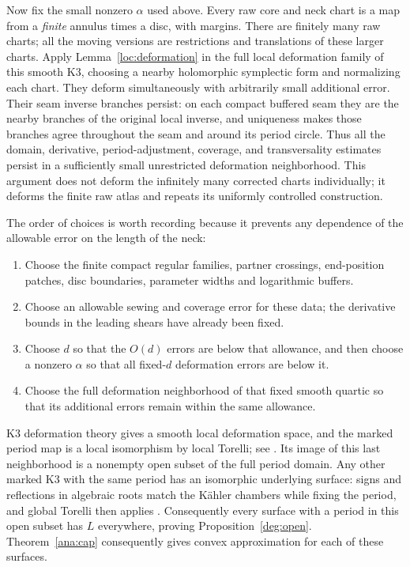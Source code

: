 Now fix the small nonzero $\alpha$ used above.  Every raw core
and neck chart is a map from a \emph{finite} annulus times a
disc, with margins.  There are finitely many raw charts;
all the moving versions are restrictions and translations of
these larger charts.  Apply Lemma~\ref{loc:deformation} in the
full local deformation family of this smooth K3, choosing a
nearby holomorphic symplectic form and normalizing each chart.
They deform simultaneously with arbitrarily small additional
error.  Their seam inverse branches persist: on each compact
buffered seam they are the nearby branches of the original
local inverse, and uniqueness makes those branches agree
throughout the seam and around its period circle.  Thus all
the domain, derivative, period-adjustment, coverage, and
transversality estimates persist in a sufficiently small
unrestricted deformation neighborhood.  This argument does
not deform the infinitely many corrected charts individually;
it deforms the finite raw atlas and repeats its uniformly
controlled construction.

The order of choices is worth recording because it prevents
any dependence of the allowable error on the length of the
neck:
\begin{enumerate}
 \item Choose the finite compact regular families, partner
       crossings, end-position patches, disc boundaries,
       parameter widths and logarithmic buffers.
 \item Choose an allowable sewing and coverage error for
       these data; the derivative bounds in the leading
       shears have already been fixed.
 \item Choose $d$ so that the $O(d)$ errors are below that
       allowance, and then choose a nonzero $\alpha$ so that
       all fixed-$d$ deformation errors are below it.
 \item Choose the full deformation neighborhood of that
       fixed smooth quartic so that its additional errors
       remain within the same allowance.
\end{enumerate}

K3 deformation theory gives a smooth local deformation space,
and the marked period map is a local isomorphism by local
Torelli; see \cite{Huybrechts}.  Its image of this last
neighborhood is a nonempty open subset of the full period
domain.  Any other marked K3 with the same period has an
isomorphic underlying surface: signs and reflections in
algebraic roots match the K\"ahler chambers while fixing the
period, and global Torelli then applies \cite{Huybrechts}.
Consequently every surface with a period in this open subset
has $L$ everywhere, proving
Proposition~\ref{deg:open}.  Theorem~\ref{ana:cap} consequently
gives convex approximation for each of these surfaces.
